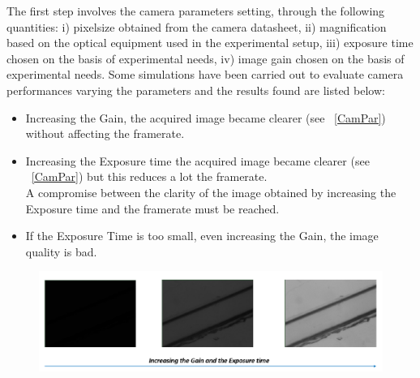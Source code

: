 \documentclass[journal]{IEEEtran}
\theoremstyle{definition}
\theoremstyle{remark}
\begin{document}
The first step involves the camera parameters setting, through the following quantities: i) pixelsize obtained from the camera datasheet, ii) magnification based on the optical equipment used in the experimental setup, iii) exposure time chosen on the basis of experimental needs, iv) image gain chosen on the basis of experimental needs. 
Some simulations have been carried out to evaluate camera performances varying the parameters and the results found are listed below:
\begin{itemize}
	\item Increasing the Gain, the acquired image became clearer (see ~\fig\ref{CamPar}) without affecting the framerate.
	\item Increasing the Exposure time the acquired image became clearer (see ~\fig\ref{CamPar}) but this reduces a lot the framerate. 
	\\A compromise between the clarity of the image obtained by increasing the Exposure time and the framerate must be reached.
	\item If the Exposure Time is too small, even increasing the Gain, the image quality is bad.
\end{itemize}

\begin{figure}[t]
	\centering
	\includegraphics[width=1\columnwidth]{images/CameraParameters}
\end{figure}
\end{document}

